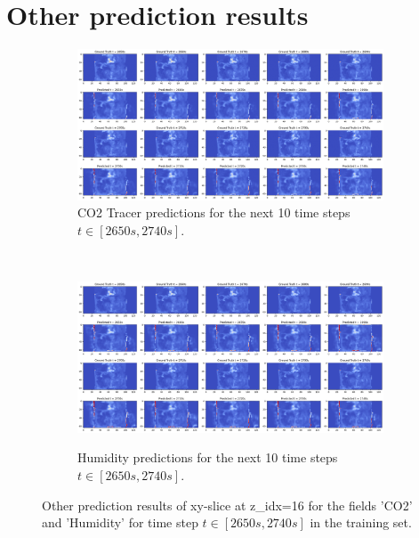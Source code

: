 \documentclass[final-report]{article-template}
\begin{document}
\section{Other prediction results}
\begin{figure}[htbp]
    \renewcommand{\figurename}{Figure}
    \renewcommand{\thefigure}{B2}
    \centering
    \begin{subfigure}[t]{0.99\textwidth}
        \centering
        \includegraphics[width=\textwidth]{figures/co2_10_2650.png}
        \caption{CO2 Tracer predictions for the next 10 time steps $t \in [2650s, 2740s]$.}
        \label{fig:co2_10_2650}
    \end{subfigure} \\[6mm]
    \begin{subfigure}[t]{0.99\textwidth}
        \centering
        \includegraphics[width=\textwidth]{figures/humid_10_2650.png}
        \label{fig:humid_10_2650}
        \caption{Humidity predictions for the next 10 time steps $t \in [2650s, 2740s]$.}
    \end{subfigure}
    \caption{Other prediction results of xy-slice at z\_idx=16 for the fields 'CO2' and 'Humidity' for time step $t \in [2650s, 2740s]$ in the training set.}
    \label{fig:other_preds}
\end{figure}
\end{document}
